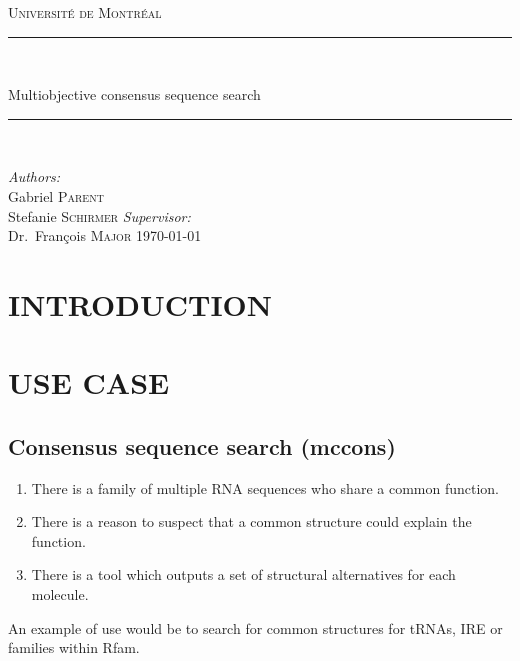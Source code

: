 \documentclass[a4paper, 12pt] {article}
\newcommand{\HRule}{\rule{\linewidth}{0.5mm}}
\begin{document}

\begin{titlepage}
\begin{center}
\textsc{\LARGE Université de Montréal}\\[1.5cm]

\HRule \\[0.4cm]

{\huge Multiobjective consensus sequence search
\HRule \\[0.4cm]}
\vfill
\emph{Authors:}\\
Gabriel \textsc{Parent}\\
Stefanie \textsc {Schirmer}
\vfill
\emph{Supervisor:} \\
Dr.~François \textsc{Major}
\vfill
{\large \today}
\end{center}
\end{titlepage}


\section*{INTRODUCTION}

\noindent
\section*{USE CASE}
\subsection*{Consensus sequence search (mccons)}
\begin{enumerate}
  \item There is a family of multiple RNA sequences who share a common function.
  \item There is a reason to suspect that a common structure could explain the function. 
  \item There is a tool which outputs a set of structural alternatives for each molecule. 
\end{enumerate}
An example of use would be to search for common structures for tRNAs, IRE or families within Rfam.
\end{document}
